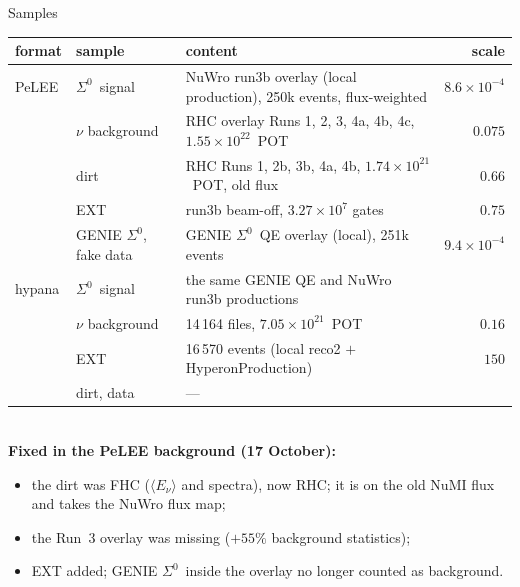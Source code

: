 \documentclass[aspectratio=169,10pt]{beamer}
\newcommand{\Szero}{\ensuremath{\Sigma^{0}}}
\begin{document}
\begin{frame}{Samples}
  \footnotesize
  \begin{tabular}{llp{}r}
    \toprule
    format & sample & content & scale \\
    \midrule
    PeLEE & \Szero\ signal & NuWro run3b overlay (local production), 250k events, flux-weighted & $8.6\times10^{-4}$ \\
          & $\nu$ background & RHC overlay Runs 1, 2, 3, 4a, 4b, 4c, $1.55\times10^{22}$~POT & $0.075$ \\
          & dirt & RHC Runs 1, 2b, 3b, 4a, 4b, $1.74\times10^{21}$~POT, old flux & $0.66$ \\
          & EXT & run3b beam-off, $3.27\times10^{7}$ gates & $0.75$ \\
          & GENIE \Szero, fake data & GENIE \Szero\ QE overlay (local), 251k events & $9.4\times10^{-4}$ \\
    \midrule
    hypana & \Szero\ signal & the same GENIE QE and NuWro run3b productions & \\
           & $\nu$ background & 14\,164 files, $7.05\times10^{21}$~POT & $0.16$ \\
           & EXT & 16\,570 events (local reco2 $+$ HyperonProduction) & $150$ \\
           & dirt, data & --- & \\
    \bottomrule
  \end{tabular}\\[6pt]
  \textbf{Fixed in the PeLEE background (17 October):}
  \begin{itemize}
    \item the dirt was FHC ($\langle E_\nu\rangle$ and spectra), now RHC; it is on the old NuMI flux and takes the NuWro flux map;
    \item the Run~3 overlay was missing ($+55\%$ background statistics);
    \item EXT added; GENIE \Szero\ inside the overlay no longer counted as background.
  \end{itemize}
\end{frame}
\end{document}
